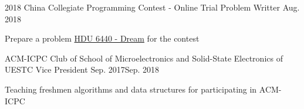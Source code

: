 
\begin{projitem}
    {2018 China Collegiate Programming Contest - Online Trial}
    {Problem Writter}
    {Aug. 2018}{}
    \item Prepare a problem \href{http://acm.hdu.edu.cn/showproblem.php?pid=6440}{HDU 6440 - Dream}
    for the contest
\end{projitem}

\begin{projitem}
    {ACM-ICPC Club of School of Microelectronics and Solid-State Electronics of UESTC}
    {Vice President}
    {Sep. 2017}{Sep. 2018}
    \item Teaching freshmen algorithms and data structures for participating in ACM-ICPC
\end{projitem}

\endinput